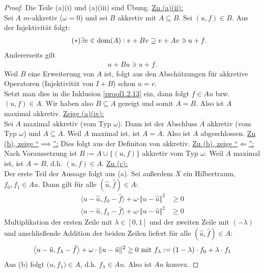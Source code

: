 \begin{proof}
	Die Teile (a)(i) und (a)(iii) sind Übung.\nl
	\underline{Zu (a)(ii):}\\
	Sei $A$ $m$-akkretiv ($\omega=0$) und sei $B$ akkretiv mit $A\subseteq B$. 
	Sei $(u,f)\in B$. 
	Aus der Injektivität folgt:
	\begin{align}\label{proof1.2.13}\tag{$\ast$}
		\exists v\in\dom(A):v+Bv\supseteq v+Av\ni u+f.
	\end{align}
	Andererseits gilt
	\begin{align*}
		u+Bu\ni u+f.
	\end{align*}
	Weil $B$ eine Erweiterung von $A$ ist, folgt aus den Abschätzungen für akkretive Operatoren 
	(Injektivität von $I+B$) schon $u=v$.\\
	Setzt man dies in die Inklusion \eqref{proof1.2.13} ein, dann folgt $f\in Au$ bzw. $(u,f)\in A$. 
	Wir haben also $B\subseteq A$ gezeigt und somit $A=B$. Also ist $A$ maximal akkretiv.\nl
	\underline{Zeige (a)(iv):}\\
	Sei $A$ maximal akkretiv (vom Typ $\omega$). 
	Dann ist der Abschluss $\overline{A}$ akkretiv (vom Typ $\omega$) und $A\subseteq\overline{A}$. 
	Weil $A$ maximal ist, ist $A=\overline{A}$. 
	Also ist $A$ abgeschlossen.\nl
	\underline{Zu (b), zeige ``$\implies$'':}
	Dies folgt aus der Definiton von akkretiv.\nl
	\underline{Zu (b), zeige ``$\Longleftarrow$'':}\\
	Nach Voraussetzung ist $B:=A\cup\big\lbrace(u,f)\big\rbrace$ akkretiv vom Typ $\omega$. 
	Weil $A$ maximal ist, ist $A=B$, d.h. $(u,f)\in A$.\nl
	\underline{Zu (c):}\\
	Der erste Teil der Aussage folgt aus (a). 
	Sei außerdem $X$ ein Hilbertraum, $f_0,f_1\in Au$. 
	Dann gilt für alle $(\hat{u},\hat{f})\in A$:
	\begin{align*}
		\big\langle u-\hat{u},f_0-\hat{f}\big\rangle+\omega\cdot\Vert u-\hat{u}\Vert^2&\geq0\\
		\big\langle u-\hat{u},f_1-\hat{f}\big\rangle+\omega\cdot\Vert u-\hat{u}\Vert^2&\geq0
	\end{align*}
	Multiplikation der ersten Zeile mit $\lambda\in[0,1]$ und der zweiten Zeile mit $(-\lambda)$ und anschließende Addition der beiden Zeilen liefert für alle $(\hat{u},\hat{f})\in A:$
	\begin{align*}
		\big\langle u-\hat{u},f_\lambda-\hat{f}\big\rangle +\omega\cdot\Vert u-\hat{u}\Vert^2\geq0\mit f_\lambda:=(1-\lambda)\cdot f_0+\lambda\cdot f_1
	\end{align*}
	Aus (b) folgt $\big(u,f_{\lambda}\big)\in A$, d.h. $f_\lambda\in Au$. 
	Also ist $Au$ konvex.
\end{proof}

